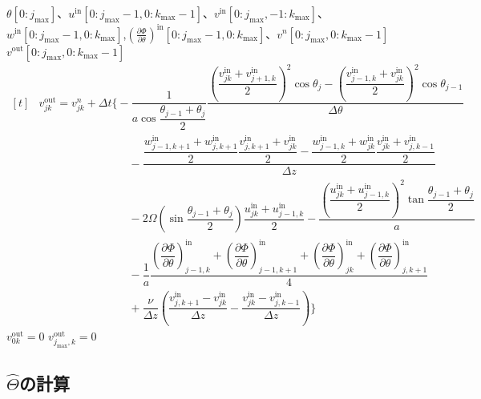 \documentclass[ja=standard,xelatex]{bxjsarticle}
\newcommand{\pdif}[2]{\dfrac{\partial{#1}}{\partial#2}}
\newcommand{\bracketnormal}[1]{\left(#1\right)}
\begin{document}
\begin{algorithm}[H]
  \caption*{\textbf{subroutine:} update\_v}
  \begin{algorithmic}[1]
    \Require $\theta[0:j_\text{max}]$、$u^\text{in}[0:j_\text{max}-1,0:k_\text{max}-1]$、$v^\text{in}[0:j_\text{max},-1:k_\text{max}]$、$w^\text{in}[0:j_\text{max}-1,0:k_\text{max}]$,$\bracketnormal{\frac{\partial\Phi}{\partial\theta}}^\text{in}[0:j_\text{max}-1,0:k_\text{max}]$、$v^n[0:j_\text{max},0:k_\text{max}-1]$
    \Ensure $v^\text{out}[0:j_\text{max},0:k_\text{max}-1]$
    \Statex
      \State $\begin{aligned}[t]
        &v_{jk}^\text{out} = v_{jk}^n + \Delta t\Bigg\{-\dfrac{1}{a\cos\dfrac{\theta_{j-1}+\theta_{j}}{2}}\dfrac{\bracketnormal{\dfrac{v^\text{in}_{jk}+v^\text{in}_{j+1,k}}{2}}^2\cos\theta_j - \bracketnormal{\dfrac{v^\text{in}_{j-1,k}+v^\text{in}_{jk}}{2}}^2\cos\theta_{j-1} }{\Delta\theta}\\[5pt]
        &\qquad\qquad\qquad\qquad - \dfrac{\dfrac{w^\text{in}_{j-1,k+1}+w^\text{in}_{j,k+1}}{2}\dfrac{v^\text{in}_{j,k+1}+v^\text{in}_{jk}}{2}-\dfrac{w^\text{in}_{j-1,k}+w^\text{in}_{jk}}{2}\dfrac{v^\text{in}_{jk}+v^\text{in}_{j,k-1}}{2}}{\Delta z}\\[5pt]
        &\qquad\qquad\qquad\qquad-2\Omega\bracketnormal{\sin\dfrac{\theta_{j-1}+\theta_{j}}{2}}\dfrac{u^\text{in}_{jk}+u^\text{in}_{j-1,k}}{2}-\dfrac{\bracketnormal{\dfrac{u^\text{in}_{jk}+u^\text{in}_{j-1,k}}{2}}^2\tan\dfrac{\theta_{j-1}+\theta_{j}}{2}}{a}\\[5pt]
        &\qquad\qquad\qquad\qquad -\dfrac{1}{a}\dfrac{\bracketnormal{\pdif{\Phi}{\theta}}^\text{in}_{j-1,k}+\bracketnormal{\pdif{\Phi}{\theta}}^\text{in}_{j-1,k+1}+\bracketnormal{\pdif{\Phi}{\theta}}^\text{in}_{jk}+\bracketnormal{\pdif{\Phi}{\theta}}^\text{in}_{j,k+1}}{4}\\[5pt]
        &\qquad\qquad\qquad\qquad +\dfrac{\nu}{\Delta z}\bracketnormal{\dfrac{v^\text{in}_{j,k+1}-v^\text{in}_{jk}}{\Delta z} - \dfrac{v^\text{in}_{jk}-v^\text{in}_{j,k-1}}{\Delta z}}\Bigg\}
      \end{aligned}$
    \EndDo
    \EndDo
    \State {}
    \State $v^\text{out}_{0k}=0$
    \State $v^\text{out}_{j_\text{max},k}=0$
    \EndDo

  \end{algorithmic}
\end{algorithm}

\subsection{\texorpdfstring{$\hat{\Theta}$の計算}{温位の計算}}
\end{document}
